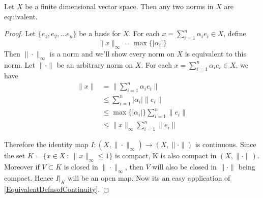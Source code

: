 \begin{corollary}
  Let $X$ be a finite dimensional vector space. Then any two norms in
  $X$ are equivalent.
\end{corollary}
\begin{proof}
  Let $\{ e_1, e_2, \ldots e_n \}$ be a basis for $X$. For each $x =
  \sum_{i = 1}^{n} \alpha_i e_i \in X$, define \[
    \|x\|_\infty = \max \{ |\alpha_i| \}
  \]
  Then $\|\cdot\|_\infty$ is a norm and we'll show every norm on $X$
  is equivalent to this norm. Let $\|\cdot\|$ be an arbitrary norm on
  $X$. For each $x = \sum_{i = 1}^{n} \alpha_i e_i \in X$, we have
  \begin{align*}
    \|x\| &= \|\sum_{i = 1}^{n} \alpha_i e_i\| \\
    & \le \sum_{i = 1}^{n} |\alpha_i|\|e_i\| \\
    &\le \max \{ |\alpha_i| \} \sum_{i = 1}^{n} \|e_i\| \\
    & \le \|x\|_\infty \sum_{i = 1}^{n} \|e_i\|
  \end{align*}

  Therefore the identity map $I: (X, \|\cdot\|_\infty) \to (X,
  \|\cdot\|)$ is continuous. Since the set $ K = \{ x \in X \ :
  \ \|x\|_\infty \le 1 \}$ is compact,  K is also compact in $(X,
  \|\cdot\|)$. Moreover if $V \subset K$ is closed
  in $\|\cdot\|_\infty$, then $V$ will also be closed
  in $ \|\cdot\|$ being compact. Hence $I|_K$ will be an open map.
  Now its an easy application of \autoref{EquivalentDefnsofContinuity}.
\end{proof}

